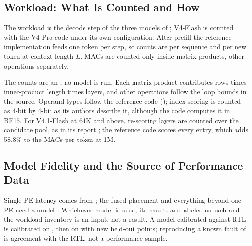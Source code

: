 \subsection{Workload: What Is Counted and How}\label{sec:workload-method}

\begin{table}[t]
\centering{}%
\caption{Share of MACs per decoded token by operand data type of the reference implementations (\evAnalytic).}\label{tab:mac-share}

\end{table}

%
The workload is the decode step of the three models of  \cite{DeepSeekAI2026V4ProHF,DeepSeekAI2026V41FlashHF} ; V4-Flash is counted with the V4-Pro code under its own configuration.
After prefill the reference implementation feeds one token per step, so counts are per sequence and per new token at context length $L$.
MACs are counted only inside matrix products, other operations separately.

%
The counts are an \evAnalytic; no model is run.
Each matrix product contributes rows times inner-product length times layers, and other operations follow the loop bounds in the source.
Operand types follow the reference code (); index scoring is counted as 4-bit by 4-bit as its authors describe it, although the code computes it in BF16.
For V4.1-Flash at 64K and above, re-scoring layers are counted over the candidate pool, as in its report \cite{DeepSeekAI2026V41Flash}; the reference code scores every entry, which adds 58.8\% to the MACs per token at 1M.

\subsection{Model Fidelity and the Source of Performance Data}\label{sec:fidelity}

%
Single-PE latency comes from \evRTL; the fused placement and everything beyond one PE need a model .
Whichever model is used, its results are labeled as such and the workload inventory is an input, not a result.
A model calibrated against RTL is calibrated on \cfgAsBuilt, then on \cfgCorrected with new held-out points; reproducing a known fault of \cfgAsBuilt is agreement with the RTL, not a performance sample.

